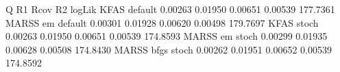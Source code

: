 \begin{Schunk}
\begin{Soutput}
                       Q      R1    Rcov      R2   logLik
KFAS default     0.00263 0.01950 0.00651 0.00539 177.7361
MARSS em default 0.00301 0.01928 0.00620 0.00498 179.7697
KFAS stoch       0.00263 0.01950 0.00651 0.00539 174.8593
MARSS em stoch   0.00299 0.01935 0.00628 0.00508 174.8430
MARSS bfgs stoch 0.00262 0.01951 0.00652 0.00539 174.8592
\end{Soutput}
\end{Schunk}
